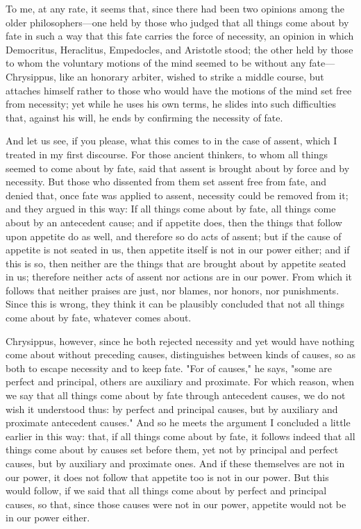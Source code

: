  To me, at any rate, it seems that, since there had been two opinions among the older philosophers—one held by those who judged that all things come about by fate in such a way that this fate carries the force of necessity, an opinion in which Democritus, Heraclitus, Empedocles, and Aristotle stood; the other held by those to whom the voluntary motions of the mind seemed to be without any fate—Chrysippus, like an honorary arbiter, wished to strike a middle course, but attaches himself rather to those who would have the motions of the mind set free from necessity; yet while he uses his own terms, he slides into such difficulties that, against his will, he ends by confirming the necessity of fate.

 And let us see, if you please, what this comes to in the case of assent, which I treated in my first discourse. For those ancient thinkers, to whom all things seemed to come about by fate, said that assent is brought about by force and by necessity. But those who dissented from them set assent free from fate, and denied that, once fate was applied to assent, necessity could be removed from it; and they argued in this way: If all things come about by fate, all things come about by an antecedent cause; and if appetite does, then the things that follow upon appetite do as well, and therefore so do acts of assent; but if the cause of appetite is not seated in us, then appetite itself is not in our power either; and if this is so, then neither are the things that are brought about by appetite seated in us; therefore neither acts of assent nor actions are in our power. From which it follows that neither praises are just, nor blames, nor honors, nor punishments. Since this is wrong, they think it can be plausibly concluded that not all things come about by fate, whatever comes about.

 Chrysippus, however, since he both rejected necessity and yet would have nothing come about without preceding causes, distinguishes between kinds of causes, so as both to escape necessity and to keep fate. "For of causes," he says, "some are perfect and principal, others are auxiliary and proximate. For which reason, when we say that all things come about by fate through antecedent causes, we do not wish it understood thus: by perfect and principal causes, but by auxiliary and proximate antecedent causes." And so he meets the argument I concluded a little earlier in this way: that, if all things come about by fate, it follows indeed that all things come about by causes set before them, yet not by principal and perfect causes, but by auxiliary and proximate ones. And if these themselves are not in our power, it does not follow that appetite too is not in our power. But this would follow, if we said that all things come about by perfect and principal causes, so that, since those causes were not in our power, appetite would not be in our power either.

